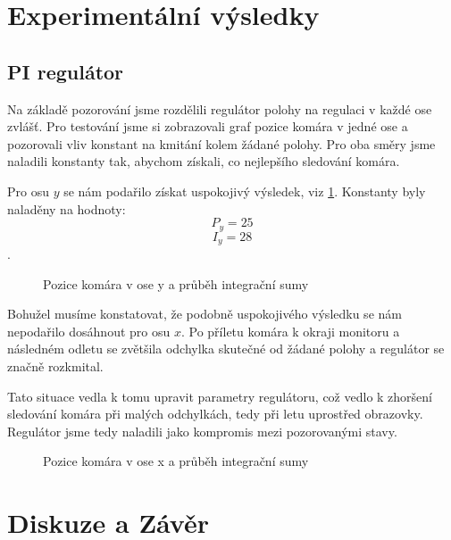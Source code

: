 \documentclass[a4paper,10pt]{article}
\begin{document}
\section{Experimentální výsledky}

\subsection{PI regulátor}

Na základě pozorování jsme rozdělili regulátor polohy na regulaci v každé ose zvlášť.
Pro testování jsme si zobrazovali graf pozice komára v jedné ose a pozorovali vliv konstant na kmitání kolem žádané polohy. 
Pro oba směry jsme naladili konstanty tak, abychom získali, co nejlepšího sledování komára.

Pro osu $y$ se nám podařilo získat uspokojivý výsledek, viz \ref{fig:osay}. Konstanty byly naladěny na hodnoty:
$$P_y = 25$$
$$I_y = 28$$.

\begin{figure}[!h]
	\centering
	\caption{Pozice komára v ose y a průběh integrační sumy}\label{fig:osay}
\end{figure}

Bohužel musíme konstatovat, že podobně uspokojivého výsledku se nám nepodařilo dosáhnout pro osu $x$. 
Po příletu komára k okraji monitoru a následném odletu se zvětšila odchylka skutečné od žádané polohy 
a regulátor se značně rozkmital. 

Tato situace vedla k tomu upravit parametry regulátoru, což vedlo k zhoršení sledování komára při malých odchylkách, 
tedy při letu uprostřed obrazovky. Regulátor jsme tedy naladili jako kompromis mezi pozorovanými stavy. 

\begin{figure}[!h]
	\centering
	\caption{Pozice komára v ose x a průběh integrační sumy}\label{fig:osax}
\end{figure}

\section{Diskuze a Závěr}



\end{document}
